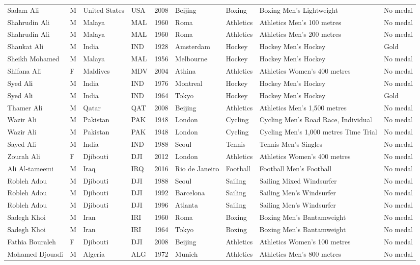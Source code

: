 \documentclass{article}%
\begin{document}
\begin{longtable}{l l l l l l l l l}
Sadam Ali&M&United States&USA&2008&Beijing&Boxing&Boxing Men's Lightweight&No medal\\%
Shahrudin Ali&M&Malaya&MAL&1960&Roma&Athletics&Athletics Men's 100 metres&No medal\\%
Shahrudin Ali&M&Malaya&MAL&1960&Roma&Athletics&Athletics Men's 200 metres&No medal\\%
Shaukat Ali&M&India&IND&1928&Amsterdam&Hockey&Hockey Men's Hockey&Gold\\%
Sheikh Mohamed&M&Malaya&MAL&1956&Melbourne&Hockey&Hockey Men's Hockey&No medal\\%
Shifana Ali&F&Maldives&MDV&2004&Athina&Athletics&Athletics Women's 400 metres&No medal\\%
Syed Ali&M&India&IND&1976&Montreal&Hockey&Hockey Men's Hockey&No medal\\%
Syed Ali&M&India&IND&1964&Tokyo&Hockey&Hockey Men's Hockey&Gold\\%
Thamer Ali&M&Qatar&QAT&2008&Beijing&Athletics&Athletics Men's 1,500 metres&No medal\\%
Wazir Ali&M&Pakistan&PAK&1948&London&Cycling&Cycling Men's Road Race, Individual&No medal\\%
Wazir Ali&M&Pakistan&PAK&1948&London&Cycling&Cycling Men's 1,000 metres Time Trial&No medal\\%
Sayed Ali&M&India&IND&1988&Seoul&Tennis&Tennis Men's Singles&No medal\\%
Zourah Ali&F&Djibouti&DJI&2012&London&Athletics&Athletics Women's 400 metres&No medal\\%
Ali Al{-}tameemi&M&Iraq&IRQ&2016&Rio de Janeiro&Football&Football Men's Football&No medal\\%
Robleh Adou&M&Djibouti&DJI&1988&Seoul&Sailing&Sailing Mixed Windsurfer&No medal\\%
Robleh Adou&M&Djibouti&DJI&1992&Barcelona&Sailing&Sailing Men's Windsurfer&No medal\\%
Robleh Adou&M&Djibouti&DJI&1996&Atlanta&Sailing&Sailing Men's Windsurfer&No medal\\%
Sadegh Khoi&M&Iran&IRI&1960&Roma&Boxing&Boxing Men's Bantamweight&No medal\\%
Sadegh Khoi&M&Iran&IRI&1964&Tokyo&Boxing&Boxing Men's Bantamweight&No medal\\%
Fathia Bouraleh&F&Djibouti&DJI&2008&Beijing&Athletics&Athletics Women's 100 metres&No medal\\%
Mohamed Djouadi&M&Algeria&ALG&1972&Munich&Athletics&Athletics Men's 800 metres&No medal\\%

\end{longtable}
\end{document}
